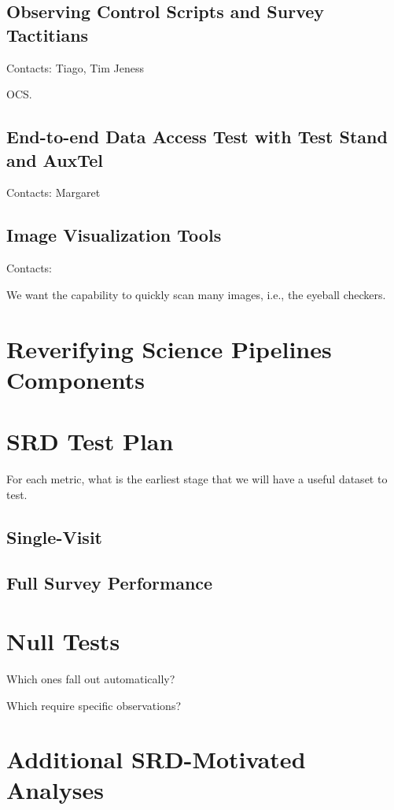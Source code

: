 \documentclass[DM,lsstdraft,toc]{lsstdoc}
\begin{document}
\subsection{Observing Control Scripts and Survey Tactitians}

Contacts: Tiago, Tim Jeness

OCS. 

\subsection{End-to-end Data Access Test with Test Stand and AuxTel}

Contacts: Margaret

\subsection{Image Visualization Tools}

Contacts:

We want the capability to quickly scan many images, i.e., the eyeball checkers.

\section{Reverifying Science Pipelines Components}

\section{SRD Test Plan}

For each metric, what is the earliest stage that we will have a useful dataset to test.

\subsection{Single-Visit}

\subsection{Full Survey Performance}

\section{Null Tests}

Which ones fall out automatically?

Which require specific observations?

\section{Additional SRD-Motivated Analyses}
\end{document}
